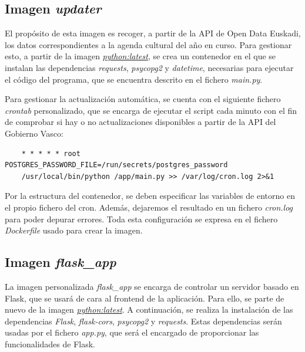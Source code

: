 \documentclass{report}
\begin{document}
        \subsection{Imagen \textit{updater}}

            El propósito de esta imagen es recoger, a partir de la API de Open Data Euskadi, los datos correspondientes a la agenda cultural del año en curso. Para gestionar esto, a partir de la imagen \textit{\href{https://hub.docker.com/_/python}{python:latest}}, se crea un contenedor en el que se instalan las dependencias \textit{requests}, \textit{psycopg2} y \textit{datetime}, necesarias para ejecutar el código del programa, que se encuentra descrito en el fichero \textit{main.py}.
    
            Para gestionar la actualización automática, se cuenta con el siguiente fichero \textit{crontab} personalizado, que se encarga de ejecutar el script cada minuto con el fin de comprobar si hay o no actualizaciones disponibles a partir de la API del Gobierno Vasco:
    
            \begin{verbatim}
    * * * * * root POSTGRES_PASSWORD_FILE=/run/secrets/postgres_password
    /usr/local/bin/python /app/main.py >> /var/log/cron.log 2>&1
            \end{verbatim}
    
            Por la estructura del contenedor, se deben especificar las variables de entorno en el propio fichero del cron. Además, dejaremos el resultado en un fichero \textit{cron.log} para poder depurar errores. Toda esta configuración se expresa en el fichero \textit{Dockerfile} usado para crear la imagen.

        \subsection{Imagen \textit{flask\_app}}

            La imagen personalizada \textit{flask\_app} se encarga de controlar un servidor basado en Flask, que se usará de cara al frontend de la aplicación. Para ello, se parte de nuevo de la imagen \textit{\href{https://hub.docker.com/_/python}{python:latest}}. A continuación, se realiza la instalación de las dependencias \textit{Flask}, \textit{flask-cors}, \textit{psycopg2} y \textit{requests}. Estas dependencias serán usadas por el fichero \textit{app.py}, que será el encargado de proporcionar las funcionalidades de Flask.
\end{document}
